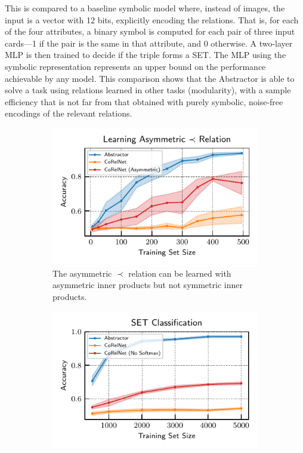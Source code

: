 This is compared to a baseline symbolic model where, instead of images, the input is a vector with 12 bits,
explicitly encoding the relations. That is, for each of the four attributes, a binary symbol is computed for each pair of three input cards---1 if the pair is the same in that attribute, and 0 otherwise. A two-layer MLP is then trained to decide if the triple forms a SET. The MLP using the symbolic representation represents an upper bound on the performance achievable by any model. This comparison shows that the Abstractor is able to solve a task using relations learned in other tasks (modularity), with a sample efficiency that is not far from that obtained with purely symbolic, noise-free encodings of the relevant relations.

\begin{figure}[t]
    \begin{subfigure}[t]{0.40\textwidth}
        \includegraphics[scale=.95]{figures/experiments/pairwise_order_learning_curves.pdf}
        \caption{The asymmetric $\prec$ relation can be learned with asymmetric inner products but not symmetric inner products.}\label{fig:exp_order_relation}
    \end{subfigure} \hspace{\fill}
    \begin{subfigure}[t]{0.40\textwidth}
        \includegraphics[scale=.95]{figures/experiments/set_classification.pdf}

\end{subfigure}
\end{figure}
